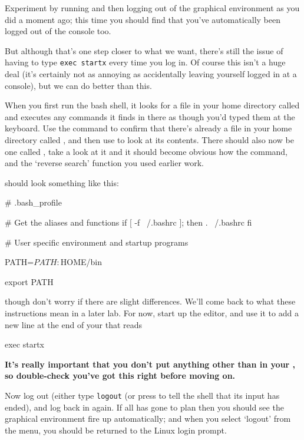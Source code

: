 Experiment by running  and then logging out of the graphical environment as you did a moment ago; this time you should find that you've automatically been logged out of the console too.

But although that's one step closer to what we want, there's still the issue of having to type \texttt{exec startx} every time you log in. Of course this isn't a huge deal (it's certainly not as annoying as accidentally leaving yourself logged in at a console), but we can do better than this. 

When you first run the bash shell, it looks for a file in your home directory called  and executes any commands it finds in there as though you'd typed them at the keyboard. Use the  command to confirm that there's already a file in your home directory called , and then use  to look at its contents. There should also now be one called , take a look at it and it should become obvious how the  command, and the `reverse search' function you used earlier work.

 should look something like this:

\begin{ttoutenv}
# .bash_profile

# Get the aliases and functions
if [ -f ~/.bashrc ]; then
	. ~/.bashrc
fi

# User specific environment and startup programs

PATH=$PATH:$HOME/bin

export PATH
\end{ttoutenv}

though don't worry if there are slight differences. We'll come back to what these instructions mean in a later lab. For now, start up the  editor, and use it to add a new line at the end of your  that reads 

\begin{ttoutenv}
exec startx
\end{ttoutenv}

\textbf{It's really important that you don't put anything other than  in your , so double-check you've got this right before moving on.}

Now log out (either type \texttt{logout} (or press  to tell the shell that its input has ended), and log back in again. If all has gone to plan then you should see the graphical environment fire up automatically; and when you select `logout' from the menu, you should be returned to the Linux login prompt. 

